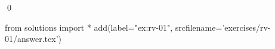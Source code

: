 
\begin{ex} 
  \label{ex:rv-01}
  
  \qed
\end{ex} 
\begin{python0}
from solutions import *
add(label="ex:rv-01",
    srcfilename='exercises/rv-01/answer.tex') 
\end{python0}
